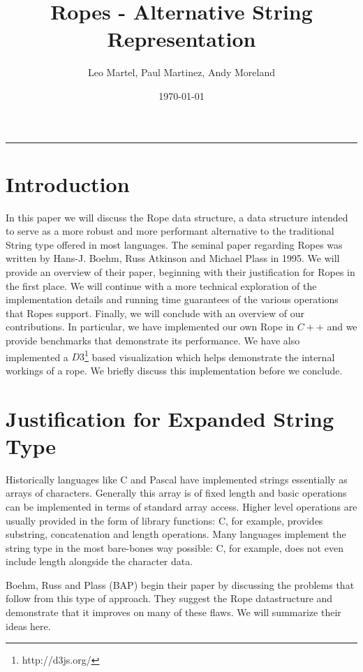 \documentclass[12pt]{article}
\title{Ropes - Alternative String Representation}
\author{Leo Martel, Paul Martinez, Andy Moreland}
\date{\today}
\begin{document}
\maketitle
\vspace{-0.3in}
\rule{\linewidth}{0.4pt}


\section{Introduction}

In this paper we will discuss the Rope data structure, a data structure intended to serve as a more robust and more performant alternative to the traditional String type offered in most languages.
The seminal paper regarding Ropes was written by Hans-J. Boehm, Russ Atkinson and Michael Plass in 1995.
We will provide an overview of their paper, beginning with their justification for Ropes in the first place.
We will continue with a more technical exploration of the implementation details and running time guarantees of the various operations that Ropes support.
Finally, we will conclude with an overview of our contributions. In particular, we have implemented our own Rope in $C++$ and we provide benchmarks that demonstrate its performance. We have also implemented a $D3$\footnote{http://d3js.org/} based visualization which helps demonstrate the internal workings of a rope. We briefly discuss this implementation before we conclude.

\section{Justification for Expanded String Type}

Historically languages like C and Pascal have implemented strings essentially as arrays of characters. Generally this array is of fixed length and basic operations can be implemented in terms of standard array access. Higher level operations are usually provided in the form of library functions: C, for example, provides substring, concatenation and length operations. Many languages implement the string type in the most bare-bones way possible: C, for example, does not even include length alongside the character data.

Boehm, Russ and Plass (BAP) begin their paper by discussing the problems that follow from this type of approach. They suggest the Rope datastructure and demonstrate that it improves on many of these flaws. We will summarize their ideas here.
\end{document}
